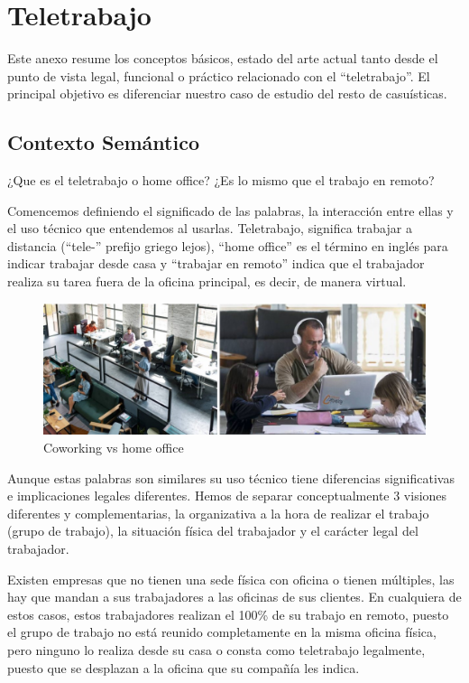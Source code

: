 \chapter{Teletrabajo}\label{S:anexo_A}

Este anexo resume los conceptos básicos, estado del arte actual tanto desde el punto de vista legal, funcional o práctico relacionado con el “teletrabajo”. El principal objetivo es diferenciar nuestro caso de estudio del resto de casuísticas.

\section{Contexto Semántico}

¿Que es el teletrabajo o home office? ¿Es lo mismo que el trabajo en remoto?

Comencemos definiendo el significado de las palabras, la interacción entre ellas y el uso técnico que entendemos al usarlas. Teletrabajo, significa trabajar a distancia (“tele-” prefijo griego lejos),  “home office” es el término en inglés para indicar trabajar desde casa y “trabajar en remoto” indica que el trabajador realiza su tarea fuera de la oficina principal, es decir, de manera virtual.

\begin{figure}[htb]
\begin{center}
\includegraphics[width=1\textwidth]{./figuras/coworking_vs_homeoffice}
\caption{Coworking\cite{i_coworking} vs home office\cite{i_family}}
\label{F:coworking_vs_homeoffice}
\end{center}
\end{figure}

Aunque estas palabras son similares su uso técnico tiene diferencias significativas e implicaciones legales diferentes. Hemos de separar conceptualmente 3 visiones diferentes y complementarias, la organizativa a la hora de realizar el trabajo (grupo de trabajo), la situación física del trabajador y el carácter legal del trabajador.

Existen empresas que no tienen una sede física con oficina o tienen múltiples, las hay que mandan a sus trabajadores a las oficinas de sus clientes. En cualquiera de estos casos, estos trabajadores realizan el 100\% de su trabajo en remoto, puesto el grupo de trabajo no está reunido completamente en la misma oficina física, pero ninguno lo realiza desde su casa o consta como teletrabajo legalmente, puesto que se desplazan a la oficina que su compañía les indica.

